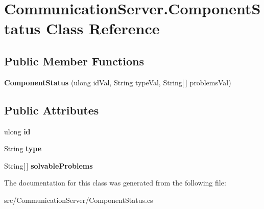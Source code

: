 \hypertarget{class_communication_server_1_1_component_status}{}\section{Communication\+Server.\+Component\+Status Class Reference}
\label{class_communication_server_1_1_component_status}
\subsection*{Public Member Functions}
\begin{DoxyCompactItemize}
\item 
\hypertarget{class_communication_server_1_1_component_status_ab0c457e0716d6bc55c5ff9c8eb61e78b}{}{\bfseries Component\+Status} (ulong id\+Val, String type\+Val, String\mbox{[}$\,$\mbox{]} problems\+Val)\label{class_communication_server_1_1_component_status_ab0c457e0716d6bc55c5ff9c8eb61e78b}

\end{DoxyCompactItemize}
\subsection*{Public Attributes}
\begin{DoxyCompactItemize}
\item 
\hypertarget{class_communication_server_1_1_component_status_a7954de9d1f582b032074564372415cb4}{}ulong {\bfseries id}\label{class_communication_server_1_1_component_status_a7954de9d1f582b032074564372415cb4}

\item 
\hypertarget{class_communication_server_1_1_component_status_a0e992fe6b9c40d68ecdcb1919ed881e7}{}String {\bfseries type}\label{class_communication_server_1_1_component_status_a0e992fe6b9c40d68ecdcb1919ed881e7}

\item 
\hypertarget{class_communication_server_1_1_component_status_a1577761590937eb560f1764a9f1ed62e}{}String\mbox{[}$\,$\mbox{]} {\bfseries solvable\+Problems}\label{class_communication_server_1_1_component_status_a1577761590937eb560f1764a9f1ed62e}

\end{DoxyCompactItemize}


The documentation for this class was generated from the following file\+:\begin{DoxyCompactItemize}
\item 
src/\+Communication\+Server/Component\+Status.\+cs\end{DoxyCompactItemize}
